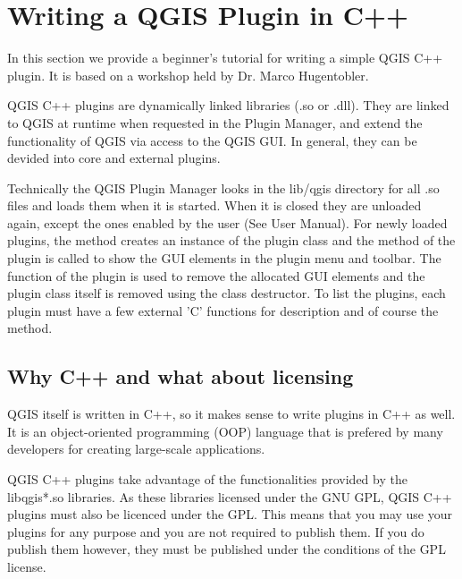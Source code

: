 \setcounter{page}{1}

\section{Writing a QGIS Plugin in C++}\label{cpp_plugin}


In this section we provide a beginner's tutorial for writing a simple QGIS
C++ plugin. It is based on a workshop held by Dr. Marco Hugentobler. 

QGIS C++ plugins are dynamically linked libraries (.so or .dll). They are
linked to QGIS at runtime when requested in the Plugin Manager, and extend the
functionality of QGIS via access to the QGIS GUI. In general, they can be devided
into core and external plugins.

Technically the QGIS Plugin Manager looks in the lib/qgis directory for all
.so files and loads them when it is started. When it is closed they are
unloaded again, except the ones enabled by the user (See User Manual). For newly loaded plugins,
the  method creates an instance of the plugin class and
the  method of the plugin is called to show the GUI elements
in the plugin menu and toolbar. The  function of the plugin
is used to remove the allocated GUI elements and the plugin class itself is
removed using the class destructor. To list the plugins, each plugin must
have a few external 'C' functions for description and of course the
 method.

\subsection{Why C++ and what about licensing}

QGIS itself is written in C++, so it makes sense to write plugins in C++
as well. It is an object-oriented programming (OOP) language that is prefered 
by many developers for creating large-scale applications.

QGIS C++ plugins take advantage of the functionalities provided by the libqgis*.so libraries. 
As these libraries licensed under the GNU GPL, QGIS C++ plugins must also be licenced under 
the GPL. This means that you may use your plugins for any purpose and you are not required to
publish them. If you do publish them however, they must be published under
the conditions of the GPL license. 

